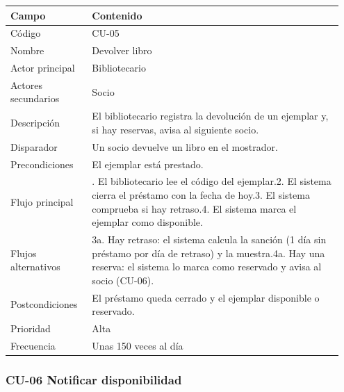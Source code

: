 {\small
\begin{longtable}{@{}>{\raggedright\arraybackslash}p{0.232\linewidth}>{\raggedright\arraybackslash}p{0.717\linewidth}@{}}
\toprule
\textbf{Campo} & \textbf{Contenido} \\
\midrule
\endhead
Código & CU-05 \\
Nombre & Devolver libro \\
Actor principal & Bibliotecario \\
Actores secundarios & Socio \\
Descripción & El bibliotecario registra la devolución de un ejemplar y, si hay reservas, avisa al siguiente socio. \\
Disparador & Un socio devuelve un libro en el mostrador. \\
Precondiciones & El ejemplar está prestado. \\
Flujo principal & 1. El bibliotecario lee el código del ejemplar.\newline{}2. El sistema cierra el préstamo con la fecha de hoy.\newline{}3. El sistema comprueba si hay retraso.\newline{}4. El sistema marca el ejemplar como disponible. \\
Flujos alternativos & 3a. Hay retraso: el sistema calcula la sanción (1 día sin préstamo por día de retraso) y la muestra.\newline{}4a. Hay una reserva: el sistema lo marca como reservado y avisa al socio (CU-06). \\
Postcondiciones & El préstamo queda cerrado y el ejemplar disponible o reservado. \\
Prioridad & Alta \\
Frecuencia & Unas 150 veces al día \\
\bottomrule
\end{longtable}}

\subsubsection*{CU-06 Notificar disponibilidad}

